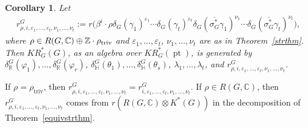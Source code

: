 \documentclass[11pt]{article}
\numberwithin{equation}{section}
\newtheorem{Corollary}[Theorem]{Corollary}
\DeclareMathOperator{\pt}{pt}
\begin{document}
\begin{Corollary}
\label{eqmodgenerators}
Let
\begin{gather*}
r^G_{\rho, i, \varepsilon_1, \dots, \varepsilon_t, \nu_1, \dots,\nu_t}
:=r\big(\beta^i\cdot\rho\delta_G(\gamma_1)^{\varepsilon_1}\cdots\delta_G(\gamma_t)^{\varepsilon_t}\delta_G(\overline{\sigma_G^*}
\gamma_1)^{\nu_1}\cdots\delta_G(\overline{\sigma_G^*}
\gamma_t)^{\nu_t}\big),
\end{gather*}
where $\rho\in R(G, \mathbb{C})\oplus \mathbb{Z}\cdot\rho_{\text{\rm triv}}$ and $\varepsilon_1, \dots, \varepsilon_t$,
$\nu_1, \dots, \nu_t$ are as in Theorem~{\rm \ref{strthm}}.
Then $KR_G^*(G)$, as an algebra over $KR_G^*(\pt)$, is generated by $\delta_\mathbb{R}^G(\varphi_1), \dots,
\delta_\mathbb{R}^G(\varphi_r)$, $\delta_\mathbb{H}^G(\theta_1), \dots, \delta_\mathbb{H}^G(\theta_s)$, $\lambda_1, \dots,
\lambda_t$, and $r^G_{\rho, i, \varepsilon_1, \dots, \varepsilon_t, \nu_1, \dots, \nu_t}$.
\end{Corollary}
\begin{Remark}
If $\rho=\rho_{\text{triv}}$, then $r^G_{\rho, i, \varepsilon_1, \dots, \varepsilon_t, \nu_1, \dots, \nu_t}=r^G_{i,
\varepsilon_1, \dots, \varepsilon_t, \nu_1, \dots, \nu_t}$.
If $\rho\in R(G, \mathbb{C})$, then $r^G_{\rho, i, \varepsilon_1, \dots, \varepsilon_t, \nu_1, \dots, \nu_t}$ comes from
$r(R(G, \mathbb{C})\otimes K^*(G))$ in the decomposition of Theorem~\ref{equivstrthm}.
\end{Remark}
\end{document}
